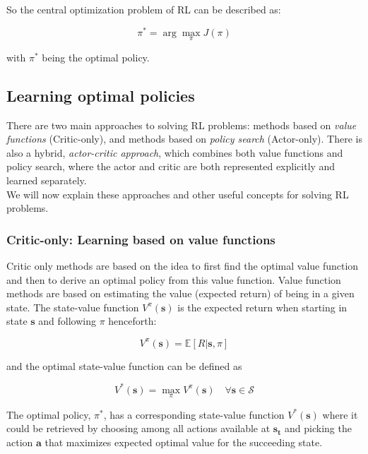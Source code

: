 So the central optimization problem of RL can be described as:
\begin{center}
		\begin{equation}
				\pi^{*}=\arg \max _{\pi} J(\pi)
		\end{equation}
\end{center}
with $\pi^*$ being the optimal policy.


\subsection{Learning optimal policies}
There are two main approaches to solving RL problems: methods based on \textit{value functions} (Critic-only), and methods based on \textit{policy search} (Actor-only).
There is also a hybrid, \textit{actor-critic approach}, which combines both value functions and policy search, where the actor and critic are both represented explicitly and learned separately.\\
We will now explain these approaches and other useful concepts for solving RL problems.

\subsubsection{Critic-only: Learning based on value functions}
Critic only methods are based on the idea to first find the optimal value function and then to
derive an optimal policy from this value function. 
Value function methods are based on estimating the value (expected return) of being in a given state.
The state-value function $V^{\pi}(\mathbf{s})$ is the expected return when starting in state $\mathbf{s}$ and following $\pi$ henceforth:
\begin{center}
		\begin{equation}
				V^{\pi}(\mathbf{s})=\mathbb{E}[R | \mathbf{s}, \pi]
		\end{equation}
\end{center}

and the optimal state-value function can be defined as
\begin{center}
		\begin{equation}
				V^{*}(\mathbf{s})=\max _{\pi} V^{\pi}(\mathbf{s}) \quad \forall \mathbf{s} \in \mathcal{S}
		\end{equation}
\end{center}

The optimal policy, $\pi^{*}$, has a corresponding state-value function $V^{*}(\mathbf{s})$ where it could be retrieved by choosing among all actions available at $\mathbf{s_t}$ and picking the action $\mathbf{a}$ that maximizes expected optimal value for the succeeding state.\\

